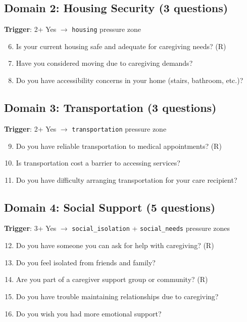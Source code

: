 \documentclass{article}
\begin{document}
\subsection*{Domain 2: Housing Security (3 questions)}
\textbf{Trigger}: 2+ Yes $\rightarrow$ \texttt{housing} pressure zone

\begin{enumerate}
    \setcounter{enumi}{5}
    \item Is your current housing safe and adequate for caregiving needs? (R)
    \item Have you considered moving due to caregiving demands?
    \item Do you have accessibility concerns in your home (stairs, bathroom, etc.)?
\end{enumerate}

\subsection*{Domain 3: Transportation (3 questions)}
\textbf{Trigger}: 2+ Yes $\rightarrow$ \texttt{transportation} pressure zone

\begin{enumerate}
    \setcounter{enumi}{8}
    \item Do you have reliable transportation to medical appointments? (R)
    \item Is transportation cost a barrier to accessing services?
    \item Do you have difficulty arranging transportation for your care recipient?
\end{enumerate}

\subsection*{Domain 4: Social Support (5 questions)}
\textbf{Trigger}: 3+ Yes $\rightarrow$ \texttt{social\_isolation} + \texttt{social\_needs} pressure zones

\begin{enumerate}
    \setcounter{enumi}{11}
    \item Do you have someone you can ask for help with caregiving? (R)
    \item Do you feel isolated from friends and family?
    \item Are you part of a caregiver support group or community? (R)
    \item Do you have trouble maintaining relationships due to caregiving?
    \item Do you wish you had more emotional support?
\end{enumerate}
\end{document}

